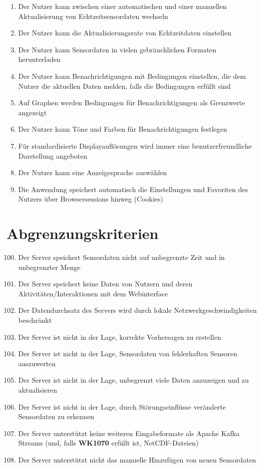 \begin{enumerate}[label=\textbf{WK\arabic{enumi}0}]
	\item Der Nutzer kann zwischen einer automatischen und einer manuellen Aktualisierung von Echtzeitsensordaten wechseln
	\item Der Nutzer kann die Aktualisierungsrate von Echtzeitdaten einstellen
	\item Der Nutzer kann Sensordaten in vielen gebräuchlichen Formaten herunterladen
	\item Der Nutzer kann Benachrichtigungen mit Bedingungen einstellen, die dem Nutzer die aktuellen Daten melden, falls die Bedingungen erfüllt sind
	\item Auf Graphen werden Bedingungen für Benachrichtigungen als Grenzwerte angezeigt
	\item Der Nutzer kann Töne und Farben für Benachrichtigungen festlegen
	\item Für standardisierte Displayauflösungen wird immer eine benutzerfreundliche Darstellung angeboten
	\item Der Nutzer kann eine Anzeigesprache auswählen
	\item Die Anwendung speichert automatisch die Einstellungen und Favoriten des Nutzers über Browsersessions hinweg (Cookies)
\end{enumerate}

\section{Abgrenzungskriterien}
\begin{enumerate}[label=\textbf{AK\arabic{enumi}0}]
	\setcounter{enumi}{99}
	\item Der Server speichert Sensordaten nicht auf unbegrenzte Zeit und in unbegrenzter Menge
	\item Der Server speichert keine Daten von Nutzern und deren Aktivitäten/Interaktionen mit dem Webinterface
	\item Der Datendurchsatz des Servers wird durch lokale Netzwerkgeschwindigkeiten beschränkt
	\item Der Server ist nicht in der Lage, korrekte Vorhersagen zu erstellen
	\item Der Server ist nicht in der Lage, Sensordaten von fehlerhaften Sensoren auszuwerten
	\item Der Server ist nicht in der Lage, unbegrenzt viele Daten anzuzeigen und zu aktualisieren
	\item Der Server ist nicht in der Lage, durch Störungseinflüsse veränderte Sensordaten zu erkennen
	\item Der Server unterstützt keine weiteren Eingabeformate als Apache Kafka Streams (und, falls \textbf{WK1070} erfüllt ist, NetCDF-Dateien)
	\item Der Server unterstützt nicht das manuelle Hinzufügen von neuen Sensordaten
\end{enumerate}